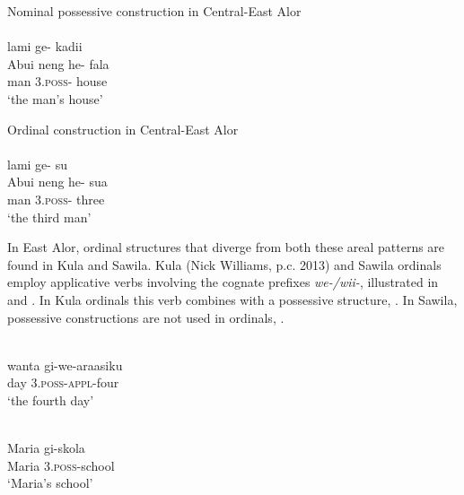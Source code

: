 \let\eachwordone=\it
\let\eachwordtwo=\it 

\ea%
\label{bkm:Ref342649962}
   Nominal possessive construction in Central-East Alor \\
\langinfo{}{}{}\\
  lami  ge-  kadii \\  
     {\rm Abui}     neng  he-  fala  \\
     {}      man  3\textsc{.poss-} house\\
 \glt `the man's house'
\z

\ea%
\label{bkm:Ref342309284}
    Ordinal construction in Central-East Alor\\
\langinfo{}{}{}\\
   lami  ge- su \\  
    {\rm Abui}     neng  he-  sua   \\
    { }  man  3\textsc{.poss-}  three\\
\glt  `the third man'
\z 



\let\eachwordone=\it
\let\eachwordtwo=\rm 

In East Alor, ordinal structures that diverge from both these areal patterns are found in Kula and Sawila. Kula (Nick Williams, p.c. 2013) and Sawila ordinals employ applicative verbs involving the cognate prefixes \textit{we-/wii-}, illustrated in  and . In Kula ordinals this verb combines with a possessive structure, . In Sawila, possessive constructions  are not used in ordinals, . 


\ea%
\label{bkm:Ref355275027}
 
\\
\gll wanta   gi-we-araasiku\\  
  day   3.\textsc{poss}{}-\textsc{appl}{}-four  \\
\glt  `the fourth day'
\z
 

\ea%
\label{bkm:Ref358037937}
\\
\gll Maria   gi-skola\\  
   Maria   3.\textsc{poss-}school \\
\glt`Maria's school'
\z
 
